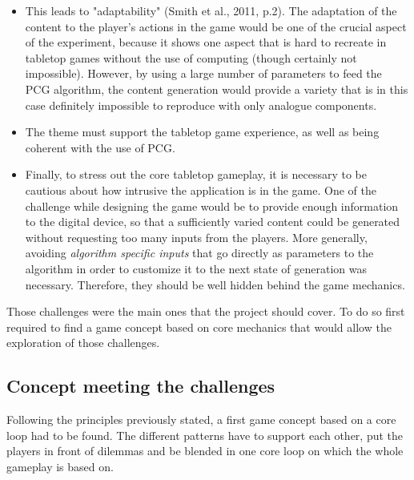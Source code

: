 \begin{itemize}
\item This leads to "adaptability" (Smith et al., 2011, p.2). The adaptation of the content to the player's actions in the game would be one of the crucial aspect of the experiment, because it shows one aspect that is hard to recreate in tabletop games without the use of computing (though certainly not impossible). However, by using a large number of parameters to feed the PCG algorithm, the content generation would provide a variety that is in this case definitely impossible to reproduce with only analogue components.
\item The theme must support the tabletop game experience, as well as being coherent with the use of PCG.
\item Finally, to stress out the core tabletop gameplay, it is necessary to be cautious about how intrusive the application is in the game. One of the challenge while designing the game would be to provide enough information to the digital device, so that a sufficiently varied content could be generated without requesting too many inputs from the players. More generally, avoiding \textit{algorithm specific inputs} that go directly as parameters to the algorithm in order to customize it to the next state of generation was necessary. Therefore, they should be well hidden  behind the game mechanics.
\end{itemize}
Those challenges were the main ones that the project should cover. To do so first required to find a game concept based on core mechanics that would allow the exploration of those challenges.
\subsection{Concept meeting the challenges}
Following the principles previously stated, a first game concept based on a core loop had to be found. The different patterns have to support each other, put the players in front of dilemmas and be blended in one core loop on which the whole gameplay is based on.
